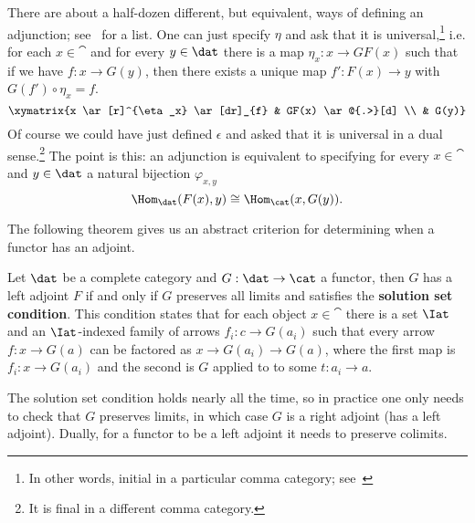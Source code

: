 There are about a half-dozen different, but equivalent, ways of defining an adjunction; see~\cite[p.81]{catwork} for a list. One can just specify $\eta$ and ask that it is universal,\footnote{In other words, initial in a particular comma category; see~\cite[p.56]{catwork}} i.e. for each $x\in\cat$ and for every $y\in\dat$ there is a map $\eta_x:x\to GF(x)$ such that if we have $f:x\to G(y)$, then there exists a unique map $f':F(x)\to y$ with $G(f')\circ \eta_x=f$. 
\[
\xymatrix{x \ar[r]^{\eta_x} \ar[dr]_{f} & GF(x) \ar@{.>}[d] \\ & G(y)}
\]
Of course we could have just defined $\epsilon$ and asked that it is universal in a dual sense.\footnote{It is final in a different comma category.} The point is this: an adjunction is equivalent to specifying for every $x\in\cat$ and $y\in\dat$ a natural bijection $\varphi_{x,y}$
\[
	\Hom_{\dat}(F(x),y)\cong\Hom_{\cat}(x,G(y)).
\]

The following theorem gives us an abstract criterion for determining when a functor has an adjoint.

\begin{thm}\label{thm:freyd}
	Let $\dat$ be a complete category and $G:\dat\to\cat$ a functor, then $G$ has a left adjoint $F$ if and only if $G$ preserves all limits and satisfies the \textbf{solution set condition}. This condition states that for each object $x\in\cat$ there is a set $\Iat$ and an $\Iat$-indexed family of arrows $f_i:c\to G(a_i)$ such that every arrow $f:x\to G(a)$ can be factored as $x\to G(a_i)\to G(a)$, where the first map is $f_i:x\to G(a_i)$ and the second is $G$ applied to to some $t:a_i\to a$.
\end{thm}

The solution set condition holds nearly all the time, so in practice one only needs to check that $G$ preserves limits, in which case $G$ is a right adjoint (has a left adjoint). Dually, for a functor to be a left adjoint it needs to preserve colimits.
